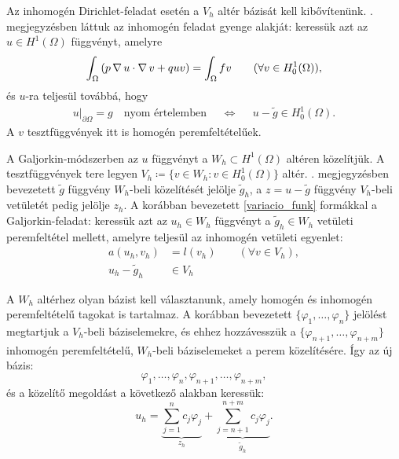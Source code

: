  
 Az inhomogén Dirichlet-feladat esetén a $V_h$ altér bázisát kell kibővítenünk. . megjegyzésben láttuk az inhomogén feladat gyenge alakját: keressük azt az  $u \in H^1(\Omega)$ függvényt, amelyre
 \begin{equation*}
		\int_{\Omega} \left( p \operatorname{\nabla} u \cdot \operatorname{\nabla} v + q u v \right) = \int_{\Omega} f v  \qquad (\forall v \in H^1_0(\Omega)), 
\end{equation*} 
és $u$-ra teljesül továbbá, hogy
\begin{align*}
	&u|_{\partial\Omega}=g \quad \text{nyom értelemben} & &\Longleftrightarrow& &u-\tilde{g} \in H^1_0(\Omega).&
\end{align*}
A $v$ tesztfüggvények itt is homogén peremfeltételűek. 

A Galjorkin-módszerben az $u$  függvényt a $W_h \subset H^1(\Omega)$ altéren közelítjük. A tesztfüggvények tere legyen $V_h \coloneqq \{v \in W_h : v \in H_0^1(\Omega) \} $  altér. . megjegyzésben bevezetett $\tilde{g}$ függvény $W_h$-beli közelítését jelölje $\tilde{g}_h$, a $z = u- \tilde{g}$ függvény $V_h$-beli vetületét pedig jelölje $z_h$.  A korábban bevezetett \eqref{variacio_funk} formákkal a Galjorkin-feladat: keressük azt az $u_h \in W_h$ függvényt a $\tilde{g}_h \in W_h$ vetületi peremfeltétel mellett, amelyre  teljesül az inhomogén vetületi egyenlet:
\begin{equation}\label{inhom_vetegy}
	\begin{aligned}
		a(u_h,v_h) &= l(v_h)  \qquad (\forall v \in V_h), \\
		u_h-\tilde{g}_h &\in V_h
	\end{aligned}
\end{equation}


A $W_h$ altérhez olyan bázist kell választanunk, amely homogén és inhomogén peremfeltételű tagokat is tartalmaz. A korábban bevezetett $\{\varphi_1, \ldots, \varphi_n \}$ jelölést megtartjuk a $V_h$-beli báziselemekre, és ehhez hozzávesszük a $\{\varphi_{n+1}, \ldots, \varphi_{n+m}\}$ inhomogén peremfeltételű, $W_h$-beli báziselemeket a perem közelítésére. Így az új bázis:
 \begin{equation*}
	\varphi_1, \ldots, \varphi_n,\varphi_{n+1}, \ldots, \varphi_{n+m},
 \end{equation*}
 és a közelítő megoldást a következő alakban keressük:
 \begin{equation*}
	u_h = \underbrace{\sum_{j=1}^n c_j\varphi_j }_{z_h}+ \underbrace{\sum_{j=n+1}^{n+m} c_j\varphi_j}_{\tilde{g}_h}.
 \end{equation*}

